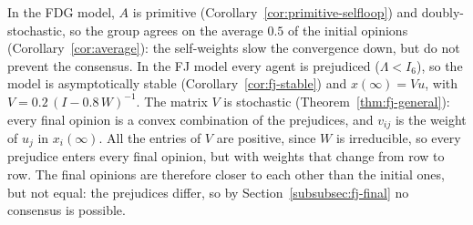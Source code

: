 In the FDG model, $A$ is primitive (Corollary~\ref{cor:primitive-selfloop}) and
doubly-stochastic, so the group agrees on the average $0.5$ of the initial opinions
(Corollary~\ref{cor:average}): the self-weights slow the convergence down, but do not
prevent the consensus. In the FJ model every agent is prejudiced ($\Lambda < I_6$), so
the model is asymptotically stable (Corollary~\ref{cor:fj-stable}) and $x(\infty) = Vu$,
with $V = 0.2\,(I - 0.8\,W)^{-1}$. The matrix $V$ is stochastic
(Theorem~\ref{thm:fj-general}): every final opinion is a convex combination of the
prejudices, and $v_{ij}$ is the weight of $u_j$ in $x_i(\infty)$. All the entries of $V$
are positive, since $W$ is irreducible, so every prejudice enters every final opinion,
 but with weights that change from
row to row. The final opinions are therefore closer to each other than the initial ones,
but not equal: the prejudices differ, so by Section~\ref{subsubsec:fj-final} no
consensus is possible.

